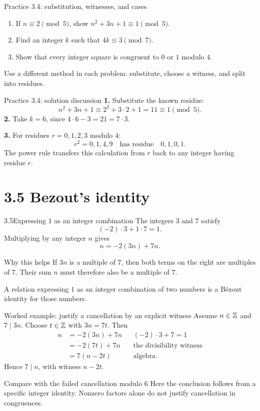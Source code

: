 \begin{frame}{Practice 3.4: substitution, witnesses, and cases}
\begin{enumerate}
\item If $n\equiv2\pmod5$, show $n^2+3n+1\equiv1\pmod5$.
\item Find an integer $k$ such that $4k\equiv3\pmod7$.
\item Show that every integer square is congruent to $0$ or $1$ modulo $4$.
\end{enumerate}
\vspace{1em}
Use a different method in each problem: substitute, choose a witness, and split into residues.
\end{frame}

\begin{frame}{Practice 3.4: solution discussion}
\textbf{1.} Substitute the known residue:
\[
n^2+3n+1\equiv2^2+3\cdot2+1=11\equiv1\pmod5.
\]
\textbf{2.} Take $k=6$, since $4\cdot6-3=21=7\cdot3$.
\medskip

\textbf{3.} For residues $r=0,1,2,3$ modulo $4$:
\[
r^2=0,1,4,9\quad\text{has residue}\quad0,1,0,1.
\]
The power rule transfers this calculation from $r$ back to any integer having residue $r$.
\end{frame}

\section{3.5 Bezout's identity}
\begin{frame}{3.5\quad Expressing $1$ as an integer combination}
The integers $3$ and $7$ satisfy
\[
(-2)\cdot3+1\cdot7=1.
\]
Multiplying by any integer $n$ gives
\[
n=-2(3n)+7n.
\]
\begin{block}{Why this helps}
If $3n$ is a multiple of $7$, then both terms on the right are multiples of $7$.
Their sum $n$ must therefore also be a multiple of $7$.
\end{block}
A relation expressing $1$ as an integer combination of two numbers is a B\'ezout identity for those numbers.
\end{frame}

\begin{frame}{Worked example: justify a cancellation by an explicit witness}
Assume $n\in\mathbb{Z}$ and $7\mid3n$. Choose $t\in\mathbb{Z}$ with $3n=7t$.
Then
\[
\begin{aligned}
n&=-2(3n)+7n&&(-2)\cdot3+7=1\\
 &=-2(7t)+7n&&\text{the divisibility witness}\\
 &=7(n-2t)&&\text{algebra}.
\end{aligned}
\]
Hence $7\mid n$, with witness $n-2t$.
\begin{block}{Compare with the failed cancellation modulo $6$}
Here the conclusion follows from a specific integer identity.
Nonzero factors alone do not justify cancellation in congruences.
\end{block}
\end{frame}

